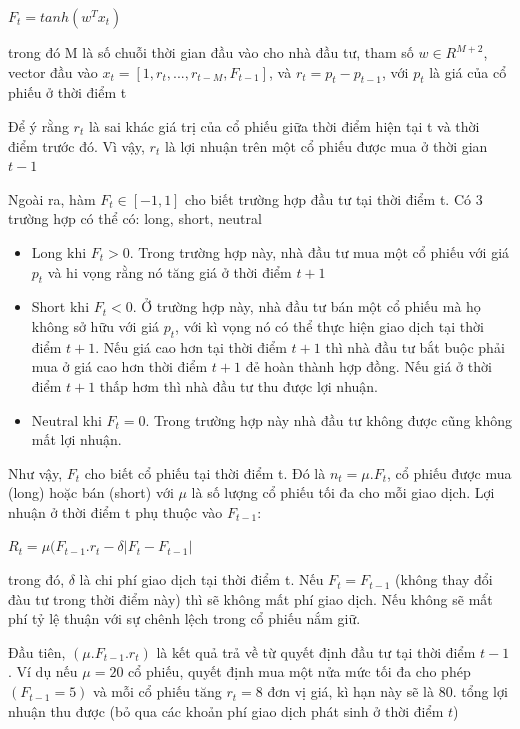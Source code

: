 \documentclass[14pt]{extreport}
\begin{document}
\begin{center}
$F_t = tanh(w^T x_t)$
\end{center}

trong đó M là số chuỗi thời gian đầu vào cho nhà đầu tư, tham số $w \in R^{M+2}$, vector đầu vào $x_t=[1,r_t,...,r_{t-M},F_{t-1}]$, và $r_t=p_t - p_{t-1}$, với $p_t$ là giá của cổ phiếu ở thời điểm t

Để ý rằng $r_t$ là sai khác giá trị của cổ phiếu giữa thời điểm hiện tại t và thời điểm trước đó. Vì vậy, $r_t$ là lợi nhuận trên một cổ phiếu được mua ở thời gian $t-1$

Ngoài ra, hàm $F_t \in [-1,1]$ cho biết trường hợp đầu tư tại thời điểm t. Có 3 trường hợp có thể có: long, short, neutral
\begin{itemize}
\item Long khi $F_t > 0$. Trong trường hợp này, nhà đầu tư mua một cổ phiếu với giá $p_t$ và hi vọng rằng nó tăng giá ở thời điểm $t+1$
\item Short khi $F_t <0$. Ở trường hợp này, nhà đầu tư bán một cổ phiếu mà họ không sở hữu với giá $p_t$, với kì vọng nó có thể thực hiện giao dịch tại thời điểm $t+1$. Nếu giá cao hơn tại thời điểm $t+1$ thì nhà đầu tư bắt buộc phải mua ở giá cao hơn thời điểm $t+1$ đẻ hoàn thành hợp đồng. Nếu giá ở thời điểm $t+1$ thấp hơm thì nhà đầu tư thu được lợi nhuận.
\item Neutral khi $F_t=0$. Trong trường hợp này nhà đầu tư không được cũng không mất lợi nhuận.
\end{itemize}

Như vậy, $F_t$ cho biết cổ phiếu tại thời điểm t. Đó là $n_t= \mu .F_t$, cổ phiếu được mua (long) hoặc bán (short) với $\mu$ là số lượng cổ phiếu tối đa cho mỗi giao dịch. Lợi nhuận ở thời điểm t phụ thuộc vào $F_{t-1}$:

\begin{center}
$R_t= \mu (F_{t-1}.r_t- \delta |F_t-F_{t-1}|$
\end{center}

trong đó, $\delta$ là chi phí giao dịch tại thời điểm t. Nếu $F_t=F_{t-1}$ (không thay đổi đàu tư trong thời điểm này) thì sẽ không mất phí giao dịch. Nếu không sẽ mất phí tỷ lệ thuận với sự chênh lệch trong cổ phiếu nắm giữ.

Đầu tiên, $(\mu . F_{t-1} .r_t)$ là kết quả trả về từ quyết định đầu tư tại thời điểm $t-1$. Ví dụ nếu $\mu=20$ cổ phiếu, quyết định mua một nửa mức tối đa cho phép $(F_{t-1}=5)$ và mỗi cổ phiếu tăng $r_t=8$ đơn vị giá, kì hạn này sẽ là 80. tổng lợi nhuận thu được (bỏ qua các khoản phí giao dịch phát sinh ở thời điểm $t$)
\end{document}
